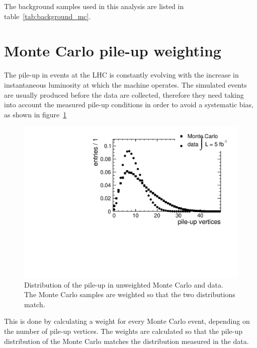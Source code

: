 The background samples used in this analysis are listed in
table~\ref{tab:background_mc}.



\section{Monte Carlo pile-up weighting}
The pile-up in events at the LHC is constantly evolving with the increase in
instantaneous luminosity at which the machine operates. The simulated events
are usually produced before the data are collected, therefore they need
taking into account the measured pile-up conditions in order to
avoid a systematic bias, as shown in figure~\ref{fig:pile_up}

\begin{figure}[htb]
    \centering
    \includegraphics[width=.7\textwidth]{images/pdf/pile_up}

    \caption{Distribution of the pile-up in unweighted Monte Carlo and data. The
    Monte Carlo samples are weighted so that the two distributions match.}
    \label{fig:pile_up}
\end{figure}

This is done by calculating a weight for every Monte Carlo event, depending
on the number of pile-up vertices.
The weights are calculated so that the pile-up distribution of the Monte
Carlo matches the distribution measured in the data.
